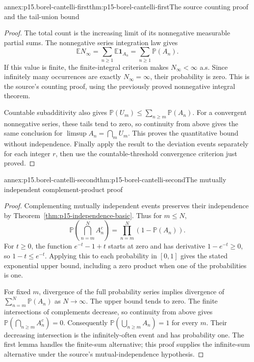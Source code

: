 \begin{annexitem}{annex:p15.borel-cantelli-first}{thm:p15-borel-cantelli-first}{The source counting proof and the tail-union bound}
\begin{proof}
The total count is the increasing limit of its nonnegative measurable
partial sums. The nonnegative series integration law gives
\[
 \mathbb E N_\infty
   =\sum_{n\geq1}\mathbb E\mathbf1_{A_n}
   =\sum_{n\geq1}\mathbb P(A_n).
\]
If this value is finite, the finite-integral criterion makes
\(N_\infty<\infty\) a.s. Since infinitely many occurrences
are exactly \(N_\infty=\infty\), their probability is zero.
This is the source's counting proof, using the previously proved
nonnegative integral theorem.

Countable subadditivity also gives
\(\mathbb P(U_m)\leq\sum_{n\geq m}\mathbb P(A_n)\).
For a convergent nonnegative series, these tails tend to zero,
so continuity from above gives the same conclusion for
\(\limsup A_n=\bigcap_m U_m\). This proves the quantitative
bound without independence. Finally apply the result to the
deviation events separately for each integer \(r\), then use
the countable-threshold convergence criterion just proved.
\end{proof}
\end{annexitem}

\begin{annexitem}{annex:p15.borel-cantelli-second}{thm:p15-borel-cantelli-second}{The mutually independent complement-product proof}
\begin{proof}
Complementing mutually independent events preserves their independence
by Theorem~\ref{thm:p15-independence-basic}. Thus for \(m\leq N\),
\[
 \mathbb P\left(\bigcap_{n=m}^N A_n^c\right)
                      =\prod_{n=m}^N(1-\mathbb P(A_n)).
\]
For \(t\geq0\), the function \(e^{-t}-1+t\) starts at
zero and has derivative \(1-e^{-t}\geq0\), so
\(1-t\leq e^{-t}\). Applying this to each probability in
\([0,1]\) gives the stated exponential upper bound, including
a zero product when one of the probabilities is one.

For fixed \(m\), divergence of the full probability series
implies divergence of \(\sum_{n=m}^N\mathbb P(A_n)\) as
\(N\to\infty\). The upper bound tends to zero. The finite
intersections of complements decrease, so continuity from above
gives \(\mathbb P(\bigcap_{n\geq m}A_n^c)=0\).
Consequently \(\mathbb P(\bigcup_{n\geq m}A_n)=1\) for
every \(m\). Their decreasing intersection is the infinitely-often
event and has probability one. The first lemma handles the
finite-sum alternative; this proof supplies the infinite-sum
alternative under the source's mutual-independence hypothesis.
\end{proof}
\end{annexitem}

